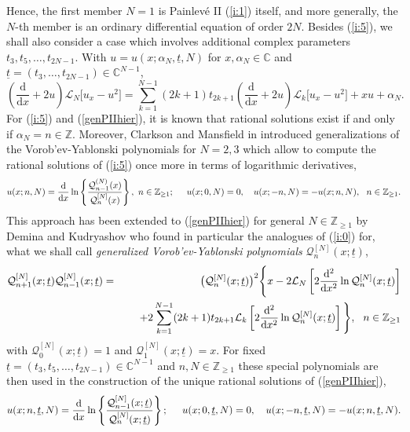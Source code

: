 \documentclass[10pt,reqno,oneside]{amsart}
\renewcommand{\d}{{\mathrm d}}
\numberwithin{equation}{section}
\def\le{\left}
\def\ri{\right}
\def\un{\underline}
\def\be{\begin{equation}}
\def\ee{\end{equation}}
\def\L{\mathcal L}
\def\eqref#1{(\ref{#1})}
\begin{document}
Hence, the first member $N=1$ is Painlev\'e II \eqref{i:1} itself, and more generally, the $N$-th member is an ordinary differential equation  of order  $2N$. 
Besides \eqref{i:5}, we shall also consider a case which involves additional complex parameters $t_3,t_5,\ldots,t_{2N-1}$. With $u=u(x;\alpha_N,\un t,N)$ for $x,\alpha_N\in\mathbb{C}$ and $\un t=(t_3,\ldots,t_{2N-1})\in\mathbb{C}^{N-1}$,
\be
\label{genPIIhier}
\left(\frac{\d}{\d x}+2u\right)\mathcal{L}_N\big[u_x-u^2\big]= \sum_{k=1}^{N-1} (2k+1) t_{2k+1}\le( \frac{\d}{\d x} +2u\ri) \L_k\big[u_x-u^2\big] + xu+ \alpha_N.
\ee
For \eqref{i:5} and \eqref{genPIIhier}, it is known \cite{G,DK2} that rational solutions exist if and only if $\alpha_N=n\in\mathbb{Z}$. Moreover, Clarkson and Mansfield in \cite{CM} introduced generalizations of the Vorob'ev-Yablonski polynomials for $N=2,3$ which allow to compute the rational solutions of \eqref{i:5} once more in terms of logarithmic derivatives,
\begin{equation*}
	u(x;n,N)=\frac{\d}{\d x}\ln\left\{\frac{\mathcal{Q}_{n-1}^{(N)}(x)}{\mathcal{Q}_n^{[N]}(x)}\right\},\ n\in\mathbb{Z}_{\geq 1};\hspace{0.5cm}u(x;0,N)=0,\ \ \ u(x;-n,N)=-u(x;n,N),\ \ n\in\mathbb{Z}_{\geq 1}.
\end{equation*}
This approach has been extended to \eqref{genPIIhier} for general $N\in\mathbb{Z}_{\geq 1}$ by Demina and Kudryashov \cite{DK1, DK2} who found in particular the analogues of \eqref{i:0} for, what we shall call {\it generalized Vorob'ev-Yablonski polynomials} $\mathcal{Q}_n^{[N]}(x;\un t)$,
\begin{eqnarray}
	\mathcal{Q}_{n+1}^{[N]}(x;\un t)\mathcal{Q}_{n-1}^{[N]}(x;\un t)&=&\big(\mathcal{Q}_n^{[N]}(x;\un t)\big)^2\Bigg\{x-2\mathcal{L}_N\left[2\frac{\d^2}{\d x^2}\ln\mathcal{Q}_n^{[N]}(x;\un t)\right]\label{diffrel}\\
	&&\hspace{0.5cm}+2\sum_{k=1}^{N-1}(2k+1)t_{2k+1}\mathcal{L}_k\left[2\frac{\d^2}{\d x^2}\ln\mathcal{Q}_n^{[N]}(x;\un t)\right]\Bigg\},\ \ n\in\mathbb{Z}_{\geq 1}\nonumber
\end{eqnarray}
with $\mathcal{Q}_0^{[N]}(x;\un t)=1$ and $\mathcal{Q}_1^{[N]}(x;\un t)=x$. For fixed $\un t=(t_3,t_5,\ldots,t_{2N-1})\in\mathbb{C}^{N-1}$ and $n,N\in\mathbb{Z}_{\geq 1}$ these special polynomials are then used in the construction of the unique rational solutions of \eqref{genPIIhier},
\begin{equation*}
	u(x;n,\un t,N)=\frac{\d}{\d x}\ln\left\{\frac{\mathcal{Q}_{n-1}^{[N]}(x;\un t)}{\mathcal{Q}_n^{[N]}(x;\un t)}\right\};\hspace{0.5cm}u(x;0,\un t,N)=0,\ \ \ u(x;-n,\un t,N)=-u(x;n,\un t,N).
\end{equation*}
\end{document}
